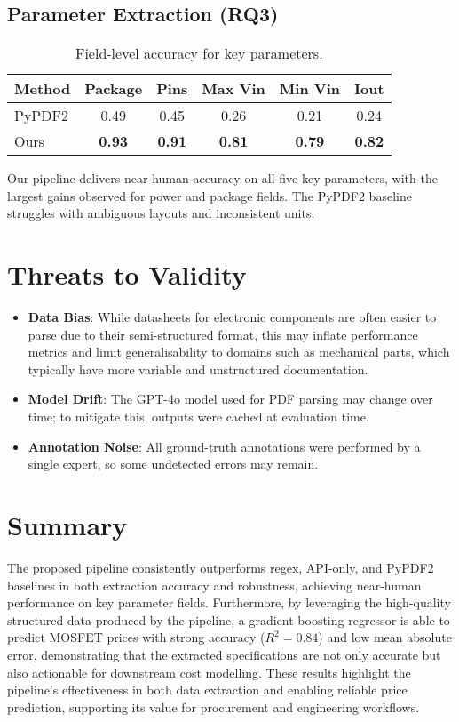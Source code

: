 \subsection{Parameter Extraction (RQ3)}
\begin{table}[H]
\centering
\caption{Field-level accuracy for key parameters.}
\label{tab:fields}
\begin{tabular}{lccccc}
\toprule
Method & Package & Pins & Max Vin & Min Vin & Iout \\
\midrule
PyPDF2    & 0.49 & 0.45 & 0.26 & 0.21 & 0.24 \\
Ours      & \textbf{0.93} & \textbf{0.91} & \textbf{0.81} & \textbf{0.79} & \textbf{0.82} \\
\bottomrule
\end{tabular}
\end{table}
Our pipeline delivers near-human accuracy on all five key parameters, with the largest gains observed for power and package fields. The PyPDF2 baseline struggles with ambiguous layouts and inconsistent units.

\section{Threats to Validity}
\begin{itemize}
  \item \textbf{Data Bias}: While datasheets for electronic components are often easier to parse due to their semi-structured format, this may inflate performance metrics and limit generalisability to domains such as mechanical parts, which typically have more variable and unstructured documentation.
  \item \textbf{Model Drift}: The GPT-4o model used for PDF parsing may change over time; to mitigate this, outputs were cached at evaluation time.
  \item \textbf{Annotation Noise}: All ground-truth annotations were performed by a single expert, so some undetected errors may remain.
\end{itemize}



\section{Summary}
The proposed pipeline consistently outperforms regex, API-only, and PyPDF2 baselines in both extraction accuracy and robustness, achieving near-human performance on key parameter fields. Furthermore, by leveraging the high-quality structured data produced by the pipeline, a gradient boosting regressor is able to predict MOSFET prices with strong accuracy ($R^2 = 0.84$) and low mean absolute error, demonstrating that the extracted specifications are not only accurate but also actionable for downstream cost modelling. These results highlight the pipeline's effectiveness in both data extraction and enabling reliable price prediction, supporting its value for procurement and engineering workflows.